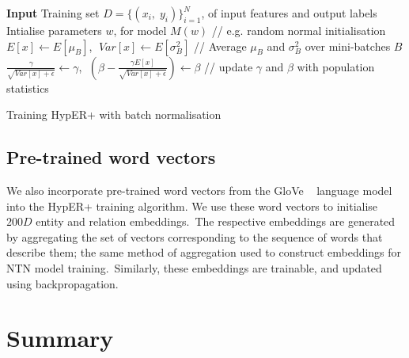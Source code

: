 \begin{algorithm}
	\SetAlgoLined
	\textbf{Input} 
	Training set $ D = \{(x_i, \; y_i)\}_{i=1}^N $, of input features and output labels\;
	Intialise parameters $ w $, for model $ M(w) $ // e.g. random normal initialisation \\
	$ E[x] \gets E[\mu_B] $, $ \; Var[x] \gets E[\sigma_B^2] $ // Average $ \mu_B $ and $ \sigma_B^2 $ over mini-batches $ B $ \\
	$ \frac{\gamma}{\sqrt{Var[x] + \epsilon}} \gets \gamma $, $ \; (\beta - \frac{\gamma E[x]}{\sqrt{Var[x] + \epsilon}}) \gets \beta $ // update $ \gamma $ and $ \beta $ with population statistics
	\caption{Training HypER+ with batch normalisation}
\end{algorithm} 
 
\subsection{Pre-trained word vectors}

We also incorporate pre-trained word vectors from the GloVe \unskip ~\citep{pennington2014glove} language model into the HypER+ training algorithm. We use these word vectors to initialise $ 200D $ entity and relation embeddings.\ The respective embeddings are generated by aggregating the set of vectors corresponding to the sequence of words that describe them; the same method of aggregation used to construct embeddings for NTN model training.\ Similarly, these embeddings are trainable, and updated using backpropagation.  

\bigskip



\section{Summary}

